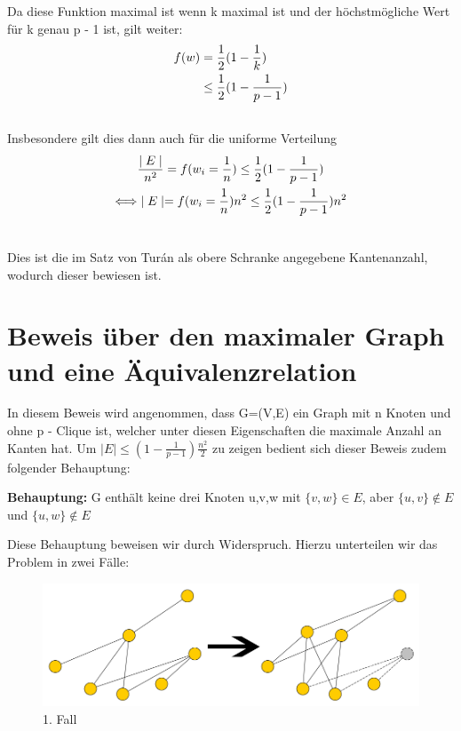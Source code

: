 \documentclass[12pt, a4paper]{article}
\begin{document}
Da diese Funktion maximal ist wenn k maximal ist und der höchstmögliche Wert für k genau p - 1 ist, gilt weiter:
\begin{gather}
\begin{split}f(w) &= \frac{1}{2} (1 - \frac{1}{k}) \\
&\le \frac{1}{2} (1 - \frac{1}{p-1})\end{split}\notag\\\begin{split}\end{split}\notag
\end{gather}
Insbesondere gilt dies dann auch für die uniforme Verteilung
\begin{gather}
\begin{split}&\frac{\mid E \mid}{n^2} = f(w_i = \frac{1}{n}) \le \frac{1}{2} (1 - \frac{1}{p-1}) \\
\Longleftrightarrow &\mid E \mid = f(w_i = \frac{1}{n})  n^2 \le \frac{1}{2} (1 - \frac{1}{p-1})  n^2\end{split}\notag\\\begin{split}\end{split}\notag
\end{gather}

Dies ist die im Satz von Turán als obere Schranke angegebene Kantenanzahl, wodurch dieser bewiesen ist.

\section{Beweis über den maximaler Graph und eine Äquivalenzrelation}
\label{proof/fifth:funfter-beweis-maximaler-graph-und-aquivalenzrelation}\label{proof/fifth::doc}\label{proof/fifth:index-1}
In diesem Beweis wird angenommen, dass G=(V,E) ein Graph mit n Knoten und ohne p - Clique ist, welcher unter diesen Eigenschaften die maximale Anzahl an Kanten hat.
Um $\mid E \mid \le (1- \frac{1}{p-1}) \frac{n^2}{2}$ zu zeigen bedient sich dieser Beweis zudem folgender Behauptung:

\textbf{Behauptung:} G enthält keine drei Knoten u,v,w mit $\{ v, w \} \in E$, aber $\{ u, v \} \notin E$ und $\{ u, w \} \notin E$

Diese Behauptung beweisen wir durch Widerspruch. Hierzu unterteilen wir das Problem in zwei Fälle:

\begin{figure}[H] 
		\centering
		\includegraphics[page=1, width=\textwidth]{assets/proof5-case1}
		\caption{1. Fall} 
\end{figure}
\end{document}
